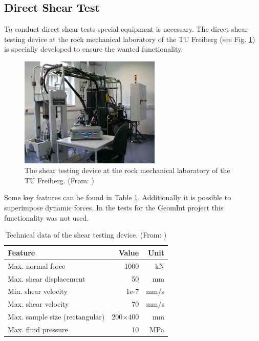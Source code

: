 \subsection{Direct Shear Test}

To conduct direct shear tests special equipment is necessary. The direct shear testing device at the rock mechanical laboratory of the TU Freiberg (see Fig. \ref{fig:ExpCNLShearMachine}) is specially developed to ensure the wanted functionality.

\begin{figure}[!ht]
\begin{center}
\includegraphics[width=0.6\textwidth]{./figures/ExpShearMachine.jpg}
\end{center}
\caption{The shear testing device at the rock mechanical laboratory of the TU Freiberg. (From: \cite{Konietzky2012})}
\label{fig:ExpCNLShearMachine}
\end{figure}

Some key features can be found in Table \ref{table:ExpCNLDeviceTechnicalData}. Additionally it is possible to superimpose dynamic forces. In the tests for the GeomInt project this functionality was not used.

\begin{table}[!ht]
\begin{center}
\begin{tabular}{l r r}
Feature & Value & Unit\\
\hline
Max. normal force & 1000 & kN\\
Max. shear displacement & 50 &mm\\
Min. shear velocity & 1e-7 & mm/s\\
Max. shear velocity & 70 & mm/s\\
Max. sample size (rectangular) & 200$\times$400 & mm\\
Max. fluid pressure & 10 & MPa\\
\end{tabular}
\caption{Technical data of the shear testing device. (From: \cite{Konietzky2012})}
\label{table:ExpCNLDeviceTechnicalData}
\end{center}
\end{table}

